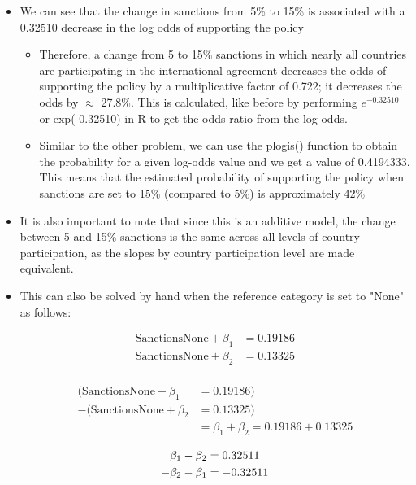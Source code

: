 \documentclass[12pt,letterpaper]{article}
\begin{document}
\begin{enumerate}
\begin{enumerate}
\begin{itemize}
		\item We can see that the change in sanctions from 5\% to 15\% is associated with a 0.32510 decrease in the log odds of supporting the policy
			\begin{itemize}
				\item Therefore, a change from 5 to 15\% sanctions in which nearly all countries are participating in the  international agreement decreases the odds of supporting the policy by a multiplicative factor of 0.722; it decreases the odds by $\approx$ 27.8\%. This is calculated, like before by performing $e^{-0.32510}$ or exp(-0.32510) in R to get the odds ratio from the log odds.
				\item Similar to the other problem, we can use the plogis() function to obtain the probability for a given log-odds value and we get a value of 0.4194333. This means that the estimated probability of supporting the policy when sanctions are set to 15\% (compared to 5\%) is approximately 42\%
				
			\end{itemize}
		\item It is also important to note that since this is an additive model, the change between 5 and 15\% sanctions is the same across all levels of country participation, as the slopes by country participation level are made equivalent.
		\item This can also be solved by hand when the reference category is set to "None" as follows:
		


\begin{align*}
	\text{SanctionsNone} + \beta_1 &= 0.19186 \\
	\text{SanctionsNone} + \beta_2 &= 0.13325 \\
\end{align*}

\begin{align*}
	(\text{SanctionsNone} + \beta_1 &= 0.19186) \\
	- (\text{SanctionsNone} + \beta_2 &= 0.13325) \\
	&= \beta_1 + \beta_2 = 0.19186 + 0.13325
\end{align*}

\begin{align*}
	\beta_1 - \beta_2 &= 0.32511 \\
	\smash{\begin{array}[t]{@{}c@{}}-\end{array}} \beta_2 - \beta_1 &= -0.32511
\end{align*}



\end{itemize}
\end{enumerate}
\end{enumerate}
\end{document}

